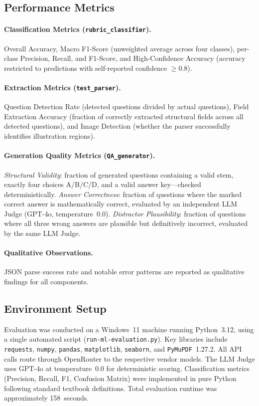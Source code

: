 \documentclass[12pt, a4paper]{article}
\begin{document}
\subsection{Performance Metrics}

\paragraph{Classification Metrics (\texttt{rubric\_classifier}).}
Overall Accuracy, Macro F1-Score (unweighted average across four classes), per-class Precision, Recall, and F1-Score, and High-Confidence Accuracy (accuracy restricted to predictions with self-reported confidence $\geq 0.8$).

\paragraph{Extraction Metrics (\texttt{test\_parser}).}
Question Detection Rate (detected questions divided by actual questions), Field Extraction Accuracy (fraction of correctly extracted structural fields across all detected questions), and Image Detection (whether the parser successfully identifies illustration regions).

\paragraph{Generation Quality Metrics (\texttt{QA\_generator}).}
\emph{Structural Validity}: fraction of generated questions containing a valid stem, exactly four choices A/B/C/D, and a valid answer key---checked deterministically. \emph{Answer Correctness}: fraction of questions where the marked correct answer is mathematically correct, evaluated by an independent LLM Judge (GPT-4o, temperature~0.0). \emph{Distractor Plausibility}: fraction of questions where all three wrong answers are plausible but definitively incorrect, evaluated by the same LLM Judge.

\paragraph{Qualitative Observations.}
JSON parse success rate and notable error patterns are reported as qualitative findings for all components.

\subsection{Environment Setup}

Evaluation was conducted on a Windows~11 machine running Python~3.12, using a single automated script (\texttt{run-ml-evaluation.py}). Key libraries include \texttt{requests}, \texttt{numpy}, \texttt{pandas}, \texttt{matplotlib}, \texttt{seaborn}, and \texttt{PyMuPDF}~1.27.2. All API calls route through OpenRouter to the respective vendor models. The LLM Judge uses GPT-4o at temperature~0.0 for deterministic scoring. Classification metrics (Precision, Recall, F1, Confusion Matrix) were implemented in pure Python following standard textbook definitions. Total evaluation runtime was approximately 158~seconds.
\end{document}
